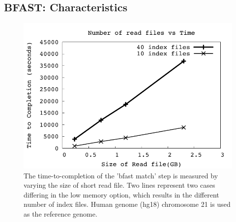 \documentclass{acm_proc_article-sp}
\begin{document}
\subsection{BFAST: Characteristics}


\begin{figure}
 \centering
\includegraphics[scale=0.66]{figures/readsvstime.pdf}

\caption{\small The time-to-completion of the 'bfast match' step is
  measured by varying the size of short read file.  Two lines
  represent two cases differing in the low memory option, which
  results in the different number of index files.  Human genome (hg18)
  chromosome 21 is used as the reference genome. }
  \label{fig:parallel-execution} 
 \end{figure}
\end{document}
